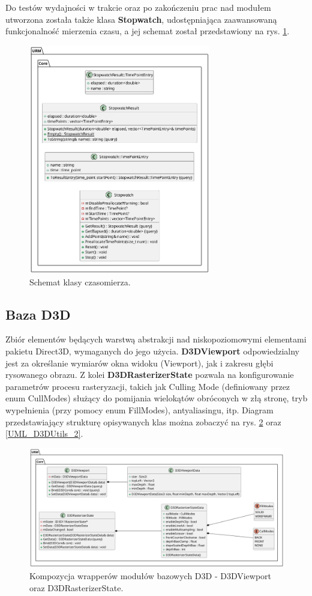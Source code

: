 	Do testów wydajności w trakcie oraz po zakończeniu prac nad modułem utworzona została także klasa \textbf{Stopwatch}, udostępniająca zaawansowaną funkcjonalność mierzenia czasu, a jej schemat został przedstawiony na rys. \ref{UML_Stopwatch}.
	
	\begin{figure}[h!]
		\centering
		\includegraphics[width=300px]{images/UML/stopwatch.png}
		\caption{Schemat klasy czasomierza.}
		\label{UML_Stopwatch}
	\end{figure}
	
\subsection{Baza D3D}
	Zbiór elementów będących warstwą abstrakcji nad niskopoziomowymi elementami pakietu Direct3D, wymaganych do jego użycia.
	\textbf{D3DViewport} odpowiedzialny jest za określanie wymiarów okna widoku (Viewport), jak i zakresu głębi rysowanego obrazu.
	Z kolei \textbf{D3DRasterizerState} pozwala na konfigurowanie parametrów procesu rasteryzacji, takich jak Culling Mode (definiowany przez enum CullModes) służący do pomijania wielokątów obróconych w złą stronę, tryb wypełnienia (przy pomocy enum FillModes), antyaliasingu, itp.
	Diagram przedstawiający strukturę opisywanych klas można zobaczyć na rys. \ref{UML_D3DUtils_1} oraz \ref{UML_D3DUtils_2}.
	
	\begin{figure}[h!]
		\centering
		\includegraphics[width=460px]{images/UML/d3dutils_1.png}
		\caption{Kompozycja wrapperów modułów bazowych D3D - D3DViewport oraz D3DRasterizerState.}
		\label{UML_D3DUtils_1}
	\end{figure}
	

